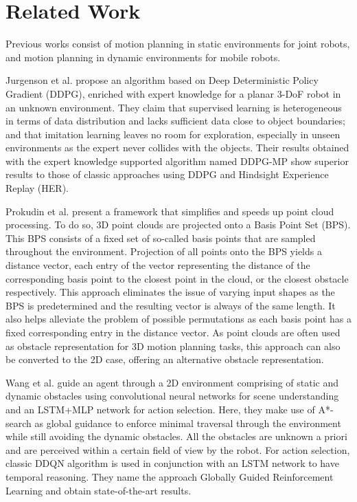 \documentclass[conference]{IEEEtran}
\begin{document}
\section{Related Work}

Previous works consist of motion planning in static environments for joint robots, and motion planning in dynamic environments for mobile robots. 

Jurgenson et al. \cite{b1} propose an algorithm based on Deep Deterministic Policy Gradient (DDPG), enriched with expert knowledge for a planar 3-DoF robot in an unknown environment. They claim that supervised learning is heterogeneous in terms of data distribution and lacks sufficient data close to object boundaries; and that imitation learning leaves no room for exploration, especially in unseen environments as the expert never collides with the objects. Their results obtained with the expert knowledge supported algorithm named DDPG-MP show superior results to those of classic approaches using DDPG and Hindsight Experience Replay (HER).

Prokudin et al. \cite{b2} present a framework that simplifies and speeds up point cloud processing. To do so, 3D point clouds are projected onto a Basis Point Set (BPS). This BPS consists of a fixed set of so-called basis points that are sampled throughout the environment. Projection of all points onto the BPS yields a distance vector, each entry of the vector representing the distance of the corresponding basis point to the closest point in the cloud, or the closest obstacle respectively. This approach eliminates the issue of varying input shapes as the BPS is predetermined and the resulting vector is always of the same length. It also helps alleviate the problem of possible permutations as each basis point has a fixed corresponding entry in the distance vector. As point clouds are often used as obstacle representation for 3D motion planning tasks, this approach can also be converted to the 2D case, offering an alternative obstacle representation.

Wang et al. \cite{b3} guide an agent through a 2D environment comprising of static and dynamic obstacles using convolutional neural networks for scene understanding and an LSTM+MLP network for action selection. Here, they make use of A*-search as global guidance to enforce minimal traversal through the environment while still avoiding the dynamic obstacles. All the obstacles are unknown a priori and are perceived within a certain field of view by the robot. For action selection, classic DDQN algorithm is used in conjunction with an LSTM network to have temporal reasoning. They name the approach Globally Guided Reinforcement Learning and obtain state-of-the-art results. 
\end{document}
